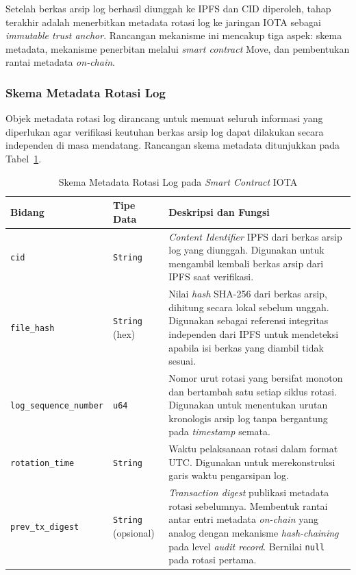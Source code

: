 Setelah berkas arsip log berhasil diunggah ke IPFS dan CID diperoleh, tahap terakhir adalah menerbitkan metadata rotasi log ke jaringan IOTA sebagai \textit{immutable trust anchor}. Rancangan mekanisme ini mencakup tiga aspek: skema metadata, mekanisme penerbitan melalui \textit{smart contract} Move, dan pembentukan rantai metadata \textit{on-chain}.

\subsubsection{Skema Metadata Rotasi Log}
\label{subsubsec:rancangan-skema-metadata}

Objek metadata rotasi log dirancang untuk memuat seluruh informasi yang diperlukan agar verifikasi keutuhan berkas arsip log dapat dilakukan secara independen di masa mendatang. Rancangan skema metadata ditunjukkan pada Tabel~\ref{tab:skema-metadata-iota}.

\begin{table}[htbp]
\centering
\caption{Skema Metadata Rotasi Log pada \textit{Smart Contract} IOTA}
\label{tab:skema-metadata-iota}
\renewcommand{\arraystretch}{1.3}
\begin{tabular}{|p{4cm}|p{3cm}|p{5.5cm}|}
\hline
\textbf{Bidang} & \textbf{Tipe Data} & \textbf{Deskripsi dan Fungsi} \\
\hline
\texttt{cid} & \texttt{String} & \textit{Content Identifier} IPFS dari berkas arsip log yang diunggah. Digunakan untuk mengambil kembali berkas arsip dari IPFS saat verifikasi. \\
\hline
\texttt{file\_hash} & \texttt{String} (hex) & Nilai \textit{hash} SHA-256 dari berkas arsip, dihitung secara lokal sebelum unggah. Digunakan sebagai referensi integritas independen dari IPFS untuk mendeteksi apabila isi berkas yang diambil tidak sesuai. \\
\hline
\texttt{log\_sequence\_number} & \texttt{u64} & Nomor urut rotasi yang bersifat monoton dan bertambah satu setiap siklus rotasi. Digunakan untuk menentukan urutan kronologis arsip log tanpa bergantung pada \textit{timestamp} semata. \\
\hline
\texttt{rotation\_time} & \texttt{String} & Waktu pelaksanaan rotasi dalam format UTC. Digunakan untuk merekonstruksi garis waktu pengarsipan log. \\
\hline
\texttt{prev\_tx\_digest} & \texttt{String} (opsional) & \textit{Transaction digest} publikasi metadata rotasi sebelumnya. Membentuk rantai antar entri metadata \textit{on-chain} yang analog dengan mekanisme \textit{hash-chaining} pada level \textit{audit record}. Bernilai \texttt{null} pada rotasi pertama. \\
\hline
\end{tabular}
\end{table}

